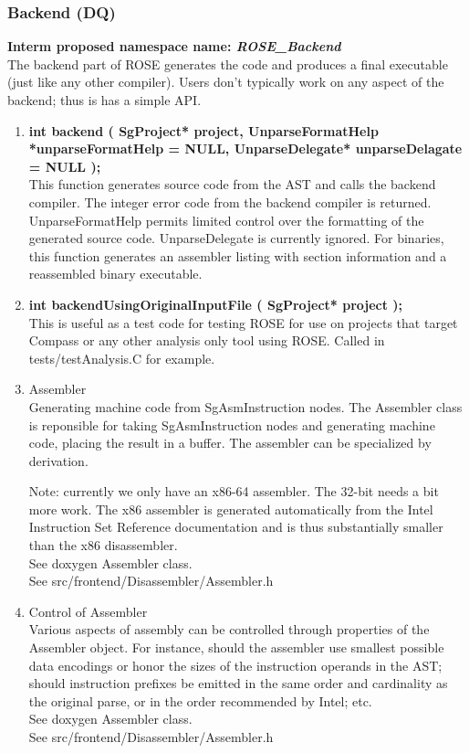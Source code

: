 \subsubsection{Backend (DQ)}
{\bf Interm proposed namespace name: {\em ROSE\_Backend}} \\
   The backend part of ROSE generates the code and produces a final executable
(just like any other compiler).  Users don't typically work on any aspect of 
the backend; thus is has a simple API.
\begin{enumerate}
   \item {\bf int backend ( SgProject* project, UnparseFormatHelp *unparseFormatHelp = NULL, UnparseDelegate* unparseDelagate = NULL );} \\
   This function generates source code from the AST and calls the backend
   compiler. The integer error code from the backend compiler is returned.
   UnparseFormatHelp permits limited control over the formatting of the 
   generated source code. UnparseDelegate is currently ignored. For binaries,
   this function generates an assembler listing with section information and
   a reassembled binary executable.

   \item {\bf int backendUsingOriginalInputFile ( SgProject* project );} \\
   This is useful as a test code for testing ROSE for use on projects that target Compass or any
   other analysis only tool using ROSE. Called in tests/testAnalysis.C for example.

   \item Assembler \\
   Generating machine code from SgAsmInstruction nodes. The
   Assembler class is reponsible for taking SgAsmInstruction
   nodes and generating machine code, placing the result in a
   buffer.  The assembler can be specialized by derivation.

   Note: currently we only have an x86-64 assembler. The 32-bit
   needs a bit more work.  The x86 assembler is generated
   automatically from the Intel Instruction Set Reference
   documentation and is thus substantially smaller than the x86
   disassembler. \\
   See doxygen Assembler class. \\
   See src/frontend/Disassembler/Assembler.h

   \item Control of Assembler \\
   Various aspects of assembly can be controlled through
   properties of the Assembler object.  For instance, should the
   assembler use smallest possible data encodings or honor the
   sizes of the instruction operands in the AST; should
   instruction prefixes be emitted in the same order and
   cardinality as the original parse, or in the order recommended
   by Intel; etc. \\
   See doxygen Assembler class. \\
   See src/frontend/Disassembler/Assembler.h

\end{enumerate}

